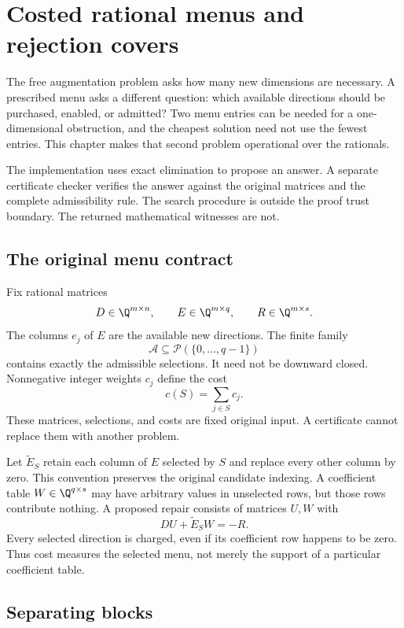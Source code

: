 \chapter{Costed rational menus and rejection covers}
\label{ch:menu-covers}

The free augmentation problem asks how many new dimensions are necessary. A prescribed menu asks a different question: which available directions should be purchased, enabled, or admitted? Two menu entries can be needed for a one-dimensional obstruction, and the cheapest solution need not use the fewest entries. This chapter makes that second problem operational over the rationals.

The implementation uses exact elimination to propose an answer. A separate certificate checker verifies the answer against the original matrices and the complete admissibility rule. The search procedure is outside the proof trust boundary. The returned mathematical witnesses are not.

\section{The original menu contract}

Fix rational matrices
\[
 D\in\Q^{m\times n},\qquad E\in\Q^{m\times q},\qquad R\in\Q^{m\times s}.
\]
The columns $e_j$ of $E$ are the available new directions. The finite family
\[
 \mathcal A\subseteq\mathcal P(\{0,\ldots,q-1\})
\]
contains exactly the admissible selections. It need not be downward closed. Nonnegative integer weights $c_j$ define the cost
\[
 c(S)=\sum_{j\in S}c_j.
\]
These matrices, selections, and costs are fixed original input. A certificate cannot replace them with another problem.

Let $\widetilde E_S$ retain each column of $E$ selected by $S$ and replace every other column by zero. This convention preserves the original candidate indexing. A coefficient table $W\in\Q^{q\times s}$ may have arbitrary values in unselected rows, but those rows contribute nothing. A proposed repair consists of matrices $U,W$ with
\begin{equation}
 DU+\widetilde E_SW=-R.
 \label{eq:menu-cover-primal}
\end{equation}
Every selected direction is charged, even if its coefficient row happens to be zero. Thus cost measures the selected menu, not merely the support of a particular coefficient table.

\section{Separating blocks}

